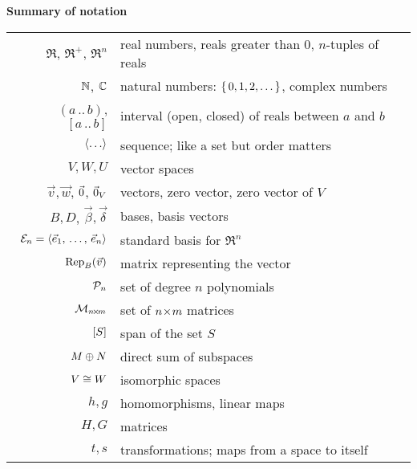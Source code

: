 %

%
%
\thispagestyle{empty}
\begin{center}
  \textbf{Summary of notation}  \\[2ex]
  \begin{tabular}{r|l}
    \( \Re \), \( \Re^+ \), \( \Re^n \) &real numbers, reals greater than $0$, $n$-tuples of reals \\
    \( \N              \),
    \( \C              \)  &natural numbers: \( \set{0,1,2,\ldots} \), complex numbers                           \\
    \( (a\,..\,b) \), \( [a\,..\,b] \) &interval (open, closed) of reals between $a$ and $b$  \\
    \( \sequence{\ldots} \)&sequence; like a set but order matters    \\
    \( V,W,U \)            &vector spaces                             \\
    \( \vec{v},\vec{w} \),
    $\zero$, $\zero_V$     &vectors, zero vector, zero vector of $V$   \\
    \( B,D \), \( \vec{\beta},\vec{\delta} \)         
                          &bases, basis vectors                      \\
    \( \stdbasis_n=\sequence{\vec{e}_1,\,\ldots,\,\vec{e}_n} \)      
                          &standard basis for $\Re^n$                \\
    \( \rep{\vec{v}}{B} \) &matrix representing the vector            \\
    \( \polyspace_n \)     &set of degree \( n \) polynomials      \\
    \( \matspace_{\nbym{n}{m}} \)  &set of \( \nbym{n}{m} \) matrices    \\
    \( \spanof{S} \)       &span of the set \( S \)                   \\
    \( M\directsum N \)    &direct sum of subspaces                   \\
    \( V\isomorphicto W \) &isomorphic spaces                         \\
    \( h,g \)              &homomorphisms, linear maps                \\
    \( H,G \)              &matrices                                  \\
    \( t,s \)              &transformations; maps from a space to itself \\

\end{tabular}
\end{center}
